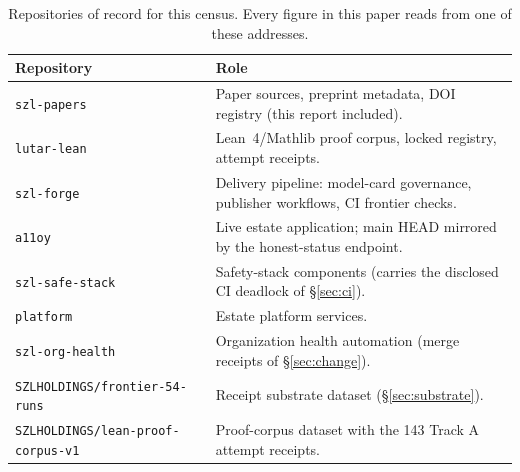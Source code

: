 \documentclass[11pt]{article}
\begin{document}
\begin{table}[htbp]
\centering
\small
\begin{tabular}{lp{8.8cm}}
\toprule
\textbf{Repository} & \textbf{Role} \\
\midrule
\texttt{szl-papers} & Paper sources, preprint metadata, DOI registry (this report included). \\
\texttt{lutar-lean} & Lean~4/Mathlib proof corpus, locked registry, attempt receipts. \\
\texttt{szl-forge} & Delivery pipeline: model-card governance, publisher workflows, CI frontier checks. \\
\texttt{a11oy} & Live estate application; main HEAD mirrored by the honest-status endpoint. \\
\texttt{szl-safe-stack} & Safety-stack components (carries the disclosed CI deadlock of \S\ref{sec:ci}). \\
\texttt{platform} & Estate platform services. \\
\texttt{szl-org-health} & Organization health automation (merge receipts of \S\ref{sec:change}). \\
\texttt{SZLHOLDINGS/frontier-54-runs} & Receipt substrate dataset (\S\ref{sec:substrate}). \\
\texttt{SZLHOLDINGS/lean-proof-corpus-v1} & Proof-corpus dataset with the 143 Track A attempt receipts. \\
\bottomrule
\end{tabular}
\caption{Repositories of record for this census. Every figure in this paper reads from one of these addresses.}
\label{tab:repos}
\end{table}
\end{document}
